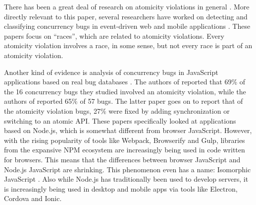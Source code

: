 \documentclass[acmsmall,anonymous,review]{acmart}\settopmatter{printfolios=true,printccs=false,printacmref=false}
\begin{document}
There has been a great deal of research on atomicity violations in general \cite{Lu2008}.
More directly relevant to this paper, several researchers have worked on detecting and classifying concurrency bugs in event-driven web and mobile applications \cite{Petrov2012, Hsiao2014, Mutlu2015, Zhang2017}.
These papers focus on ``races'', which are related to atomicity violations.
Every atomicity violation involves a race, in some sense, but not every race is part of an atomicity violation.


Another kind of evidence is analysis of concurrency bugs in JavaScript applications based on real bug databases \cite{Davis2017, Hong2014, Wang2017}.
The authors of \cite{Davis2017} reported that 69\% of the 16 concurrency bugs they studied involved an atomicity violation, while the authors of \cite{Wang2017} reported 65\% of 57 bugs.
The latter paper goes on to report that of the atomicity violation bugs, 27\% were fixed by adding synchronization or switching to an atomic API.
These papers specifically looked at applications based on Node.js, which is somewhat different from browser JavaScript.
However, with the rising popularity of tools like Webpack, Browserify and Gulp, libraries from the expansive NPM ecosystem are increasingly being used in code written for browsers\footnotemark{}.
This means that the differences between browser JavaScript and Node.js JavaScript are shrinking.
This phenomenon even has a name: Isomorphic JavaScript \cite{Brehm2013}.
Also while Node.js has traditionally been used to develop servers, it is increasingly being used in desktop and mobile apps via tools like Electron, Cordova and Ionic.

\end{document}
